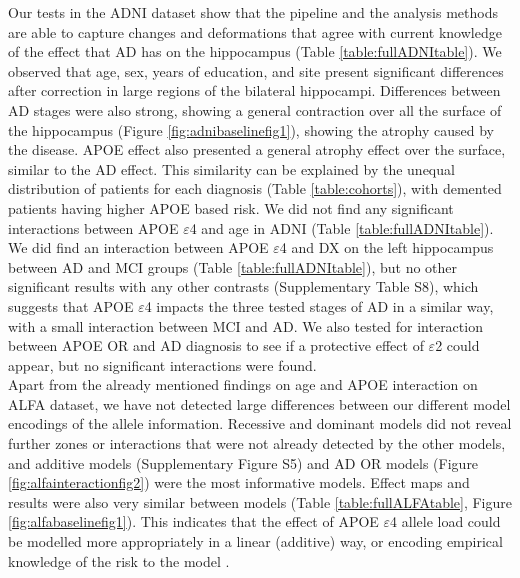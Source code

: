 Our tests in the ADNI dataset show that the pipeline and the analysis methods are able to capture changes and deformations that agree with current knowledge of the effect that AD has on the hippocampus (Table \ref{table:fullADNItable}). We observed that age, sex, years of education, and site present significant differences after correction in large regions of the bilateral hippocampi. Differences between AD stages were also strong, showing a general contraction over all the surface of the hippocampus (Figure \ref{fig:adnibaselinefig1}), showing the atrophy caused by the disease. APOE effect also presented a general atrophy effect over the surface, similar to the AD effect. This similarity can be explained by the unequal distribution of patients for each diagnosis (Table \ref{table:cohorts}), with demented patients having higher APOE based risk. We did not find any significant interactions between APOE $\varepsilon$4 and age in ADNI (Table \ref{table:fullADNItable}). We did find an interaction between APOE $\varepsilon$4 and DX on the left hippocampus between AD and MCI groups (Table \ref{table:fullADNItable}), but no other significant results with any other contrasts (Supplementary Table S8), which suggests that APOE $\varepsilon$4 impacts the three tested stages of AD in a similar way, with a small interaction between MCI and AD. We also tested for interaction between APOE OR and AD diagnosis to see if a protective effect of $\varepsilon$2 could appear, but no significant interactions were found. \\

Apart from the already mentioned findings on age and APOE interaction on ALFA dataset, we have not detected large differences between our different model encodings of the allele information. Recessive and dominant models did not reveal further zones or interactions that were not already detected by the other models, and additive models (Supplementary Figure S5) and AD OR models (Figure \ref{fig:alfainteractionfig2}) were the most informative models. Effect maps and results were also very similar between models (Table \ref{table:fullALFAtable}, Figure \ref{fig:alfabaselinefig1}). This indicates that the effect of APOE $\varepsilon$4 allele load could be modelled more appropriately in a linear (additive) way, or encoding empirical knowledge of the risk to the model \cite{Reiman2020}. \\

